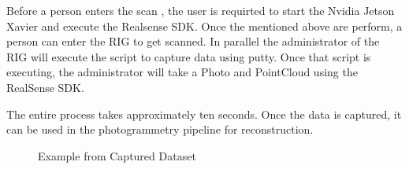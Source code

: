 \documentclass[12pt]{report}
\begin{document}
Before a person enters the scan , the user is requirted to start the Nvidia Jetson Xavier and execute the Realsense SDK.
Once the mentioned above are perform, a person can enter the RIG to get scanned.
In parallel the administrator of the RIG will execute the script to capture data using putty. Once that script is executing, the administrator will take a Photo and PointCloud
using the RealSense SDK. 

The entire process takes approximately ten seconds. Once the data is captured, it can be used in the photogrammetry pipeline for reconstruction.
\begin{figure}[H]
  \centering
  \qquad
  \qquad
  \qquad
  \qquad
  \caption{Example from Captured Dataset}
  \label{fig:examples}
\end{figure}
\end{document}
